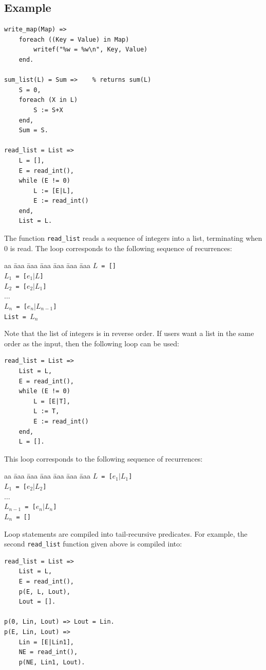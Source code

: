 \subsection*{Example}
\begin{verbatim}
write_map(Map) =>
    foreach ((Key = Value) in Map)
        writef("%w = %w\n", Key, Value)
    end.

sum_list(L) = Sum =>    % returns sum(L)
    S = 0,
    foreach (X in L)
        S := S+X
    end,
    Sum = S.

read_list = List =>
    L = [],
    E = read_int(),
    while (E != 0) 
        L := [E|L],
        E := read_int()
    end,
    List = L.
\end{verbatim}
The function \texttt{read\_list} reads a sequence of integers into a list, terminating when 0 is read. The loop corresponds to the following sequence of recurrences:
\begin{tabbing}
aa \= aaa \= aaa \= aaa \= aaa \= aaa \= aaa \kill
\> \texttt{$L$ = []} \\
\> \texttt{$L_1$ = [$e_1$$|$$L$]} \\
\> \texttt{$L_2$ = [$e_2$$|$$L_1$]} \\
\> $\ldots$ \\
\> \texttt{$L_n$ = [$e_n$$|$$L_{n-1}$]} \\
\> \texttt{List = $L_n$}
\end{tabbing}
Note that the list of integers is in reverse order. If users want a list in the same order as the input, then the following loop can be used:
\begin{verbatim}
read_list = List =>
    List = L,
    E = read_int(),
    while (E != 0) 
        L = [E|T],
        L := T,
        E := read_int()
    end,
    L = [].
\end{verbatim}
This loop corresponds to the following sequence of recurrences:
\begin{tabbing}
aa \= aaa \= aaa \= aaa \= aaa \= aaa \= aaa \kill
\> \texttt{$L$ = [$e_1$$|$$L_1$]} \\
\> \texttt{$L_1$ = [$e_2$$|$$L_2$]} \\
\> $\ldots$ \\
\> \texttt{$L_{n-1}$ = [$e_n$$|$$L_{n}$]} \\
\> \texttt{$L_n$ = []}
\end{tabbing}
Loop statements are compiled into tail-recursive predicates. For example, the second \texttt{read\_list} function given above is compiled into:
\begin{verbatim}
read_list = List =>
    List = L,
    E = read_int(),
    p(E, L, Lout),
    Lout = [].

p(0, Lin, Lout) => Lout = Lin.
p(E, Lin, Lout) => 
    Lin = [E|Lin1],
    NE = read_int(),
    p(NE, Lin1, Lout).
\end{verbatim}

